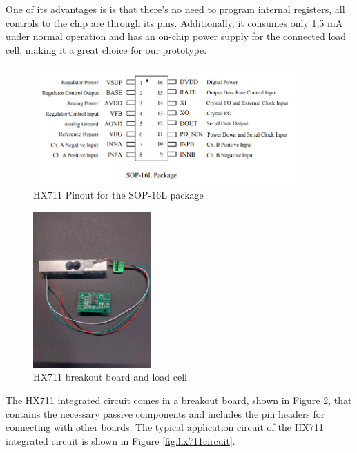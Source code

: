 \documentclass[openright]{normas-utf-tex} %
\begin{document}
One of its advantages is is that there's no need to program internal registers,
all controls to the chip are through its pins. Additionally, it consumes only
1,5 mA under normal operation and has an on-chip power supply for the connected
load cell, making it a great choice for our prototype.

\begin{figure}[H]
	\centering
	\includegraphics[width=0.9\textwidth]{./images/hx711-pinout.png}
	\caption[HX711 Pinout for the SOP-16L package]{HX711 Pinout for the SOP-16L package}
	\label{fig:hx711pinout}
\end{figure}

\begin{figure}[H]
	\centering
	\includegraphics[width=0.4\textwidth]{./images/hx711.jpeg}
	\caption[HX711 breakout board and load cell]{HX711 breakout board and load cell}
	\label{fig:weighttesting}
\end{figure}

The HX711 integrated circuit comes in a breakout board, shown in Figure
\ref{fig:weighttesting}, that contains the necessary passive components and
includes the pin headers for connecting with other boards. The typical application 
circuit of the HX711 integrated circuit is shown in Figure \ref{fig:hx711circuit}.
\end{document}
